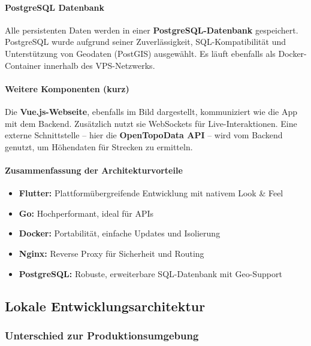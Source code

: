 \documentclass[11pt,a4paper]{article}
\begin{document}
\paragraph{PostgreSQL Datenbank}
Alle persistenten Daten werden in einer \textbf{PostgreSQL-Datenbank}\cite{postgresql} gespeichert. PostgreSQL wurde aufgrund seiner Zuverlässigkeit, SQL-Kompatibilität und Unterstützung von Geodaten (PostGIS) ausgewählt. Es läuft ebenfalls als Docker-Container innerhalb des VPS-Netzwerks.

\paragraph{Weitere Komponenten (kurz)}
Die \textbf{Vue.js-Webseite}\cite{vuejs}, ebenfalls im Bild dargestellt, kommuniziert wie die App mit dem Backend. Zusätzlich nutzt sie WebSockets für Live-Interaktionen. Eine externe Schnittstelle – hier die \textbf{OpenTopoData API}\cite{open_topo_data} – wird vom Backend genutzt, um Höhendaten für Strecken zu ermitteln.

\paragraph{Zusammenfassung der Architekturvorteile}
\begin{itemize}
    \item \textbf{Flutter:}\cite{flutter} Plattformübergreifende Entwicklung mit nativem Look \& Feel
    \item \textbf{Go:}\cite{golang} Hochperformant, ideal für APIs
    \item \textbf{Docker:}\cite{docker} Portabilität, einfache Updates und Isolierung
    \item \textbf{Nginx:}\cite{nginx} Reverse Proxy für Sicherheit und Routing
    \item \textbf{PostgreSQL:}\cite{postgresql} Robuste, erweiterbare SQL-Datenbank mit Geo-Support
\end{itemize}

\subsection{Lokale Entwicklungsarchitektur}
\label{sec:lokale-entwicklung}

\subsubsection{Unterschied zur Produktionsumgebung}
\end{document}
